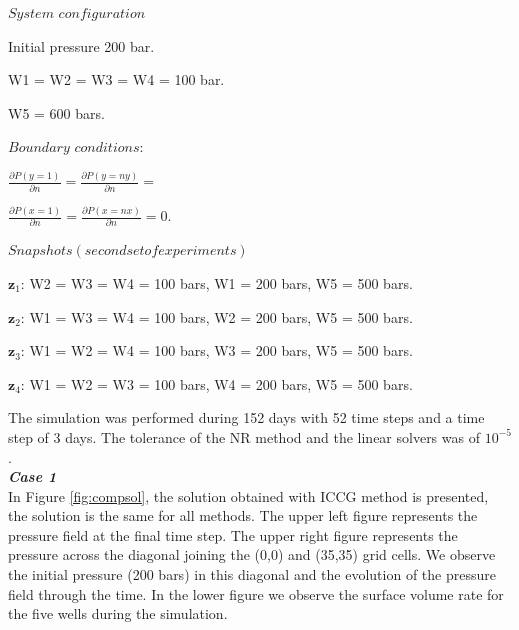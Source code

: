 \documentclass[12pt]{article}
\begin{document}
\begin{itemize}
\begin{minipage}{.6\textwidth}
\item[]  $System$ $configuration$
\item[] Initial pressure 200 bar.
 \item[]  W1 =  W2 = W3 = W4 = 100 bar.
 \item[] W5 = 600 bars.\\
 \end{minipage}%
\begin{minipage}{.4\textwidth}
\item[] $Boundary$ $conditions:$\\
\item[] $\frac{\partial P(y=1)}{\partial n}=\frac{\partial P(y=ny)}{\partial n}=$
\item[] $\frac{\partial P(x=1)}{\partial n}=\frac{\partial P(x=nx)}{\partial n}=0$.
\end{minipage}
\begin{minipage}{.8\textwidth}
\item[] $Snapshots (second set of experiments)$ 
 \item[] $\mathbf{z}_1$:  W2 = W3 = W4 =  100 bars, 
 W1 = 200 bars, W5 = 500 bars.
\item[] $\mathbf{z}_2$: W1 = W3 = W4 = 100 bars,
 W2 = 200 bars, W5 = 500 bars.
\item[] $\mathbf{z}_3$: W1 = W2 = W4 = 100 bars,
 W3 = 200 bars, W5 =  500 bars.
\item[] $\mathbf{z}_4$:  W1 = W2 = W3 = 100 bars,
 W4 = 200 bars, W5 =  500 bars.\\
\end{minipage}%
\end{itemize}
The simulation was performed during 152 days with 52 time steps and a time step of 3 days. The tolerance of the NR method and the linear solvers was of $10^{-5}$.\\
\emph{\textbf{Case 1}}\\
In Figure \ref{fig:compsol}, the solution obtained with ICCG method is presented, the solution is the same for all methods. The upper left figure represents the pressure field at the final time step. The upper right figure represents the pressure across the diagonal joining the (0,0) and (35,35) grid cells. We observe the initial pressure (200 bars) in this diagonal and the evolution of the pressure field through the time. In the lower figure we observe the surface volume rate for the five wells during the simulation.\\
\end{document}

